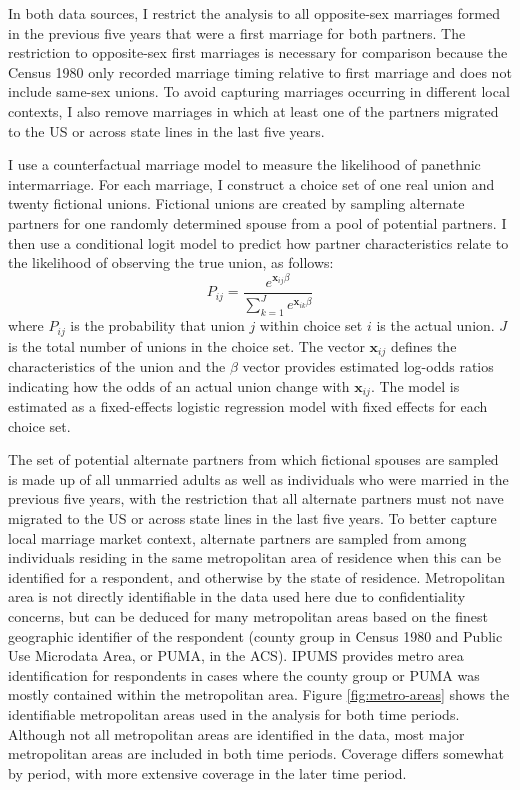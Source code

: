 \documentclass[11pt,]{article}
\begin{document}
In both data sources, I restrict the analysis to all opposite-sex marriages formed in the previous five years that were a first marriage for both partners. The restriction to opposite-sex first marriages is necessary for comparison because the Census 1980 only recorded marriage timing relative to first marriage and does not include same-sex unions. To avoid capturing marriages occurring in different local contexts, I also remove marriages in which at least one of the partners migrated to the US or across state lines in the last five years.

I use a counterfactual marriage model \citep{qian_marriage_2018, gullickson_counterfactual_2021} to measure the likelihood of panethnic intermarriage. For each marriage, I construct a choice set of one real union and twenty fictional unions. Fictional unions are created by sampling alternate partners for one randomly determined spouse from a pool of potential partners. I then use a conditional logit model to predict how partner characteristics relate to the likelihood of observing the true union, as follows: 
\begin{equation}
P_{ij}=\frac{e^{\mathbf{x}_{ij}\beta}}{\sum_{k=1}^J e^{\mathbf{x}_{ik}\beta}}
\end{equation}
where \(P_{ij}\) is the probability that union \(j\) within choice set \(i\) is the actual union. \(J\) is the total number of unions in the choice set. The vector \(\mathbf{x}_{ij}\) defines the characteristics of the union and the \(\beta\) vector provides estimated log-odds ratios indicating how the odds of an actual union change with \(\mathbf{x}_{ij}\). The model is estimated as a fixed-effects logistic regression model with fixed effects for each choice set.

The set of potential alternate partners from which fictional spouses are sampled is made up of all unmarried adults as well as individuals who were married in the previous five years, with the restriction that all alternate partners must not nave migrated to the US or across state lines in the last five years. To better capture local marriage market context, alternate partners are sampled from among individuals residing in the same metropolitan area of residence when this can be identified for a respondent, and otherwise by the state of residence. Metropolitan area is not directly identifiable in the data used here due to confidentiality concerns, but can be deduced for many metropolitan areas based on the finest geographic identifier of the respondent (county group in Census 1980 and Public Use Microdata Area, or PUMA, in the ACS). IPUMS provides metro area identification for respondents in cases where the county group or PUMA was mostly contained within the metropolitan area. Figure \ref{fig:metro-areas} shows the identifiable metropolitan areas used in the analysis for both time periods. Although not all metropolitan areas are identified in the data, most major metropolitan areas are included in both time periods. Coverage differs somewhat by period, with more extensive coverage in the later time period.
\end{document}
